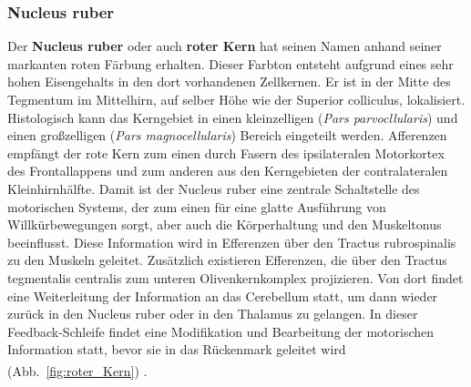 \subsubsection*{Nucleus ruber} 
Der \textbf{Nucleus ruber} oder auch \textbf{roter Kern} hat seinen Namen anhand seiner markanten roten Färbung erhalten. Dieser Farbton entsteht aufgrund eines sehr hohen Eisengehalts in den dort vorhandenen Zellkernen. Er ist in der Mitte des Tegmentum im Mittelhirn, auf selber Höhe wie der Superior colliculus, lokalisiert. Histologisch kann das Kerngebiet in einen kleinzelligen (\textit{Pars parvocllularis}) und einen großzelligen (\textit{Pars magnocellularis}) Bereich eingeteilt werden. Afferenzen empfängt der rote Kern zum einen durch Fasern des ipsilateralen Motorkortex des Frontallappens und zum anderen aus den Kerngebieten der contralateralen Kleinhirnhälfte. Damit ist der Nucleus ruber eine zentrale Schaltstelle des motorischen Systems, der zum einen für eine glatte Ausführung von Willkürbewegungen sorgt, aber auch die Körperhaltung und den Muskeltonus beeinflusst. Diese Information wird in Efferenzen über den Tractus rubrospinalis zu den Muskeln geleitet. Zusätzlich existieren Efferenzen, die über den Tractus tegmentalis centralis zum unteren Olivenkernkomplex projizieren. Von dort findet eine Weiterleitung der Information an das Cerebellum statt, um dann wieder zurück in den Nucleus ruber oder in den Thalamus zu gelangen. In dieser Feedback-Schleife findet eine Modifikation und Bearbeitung der motorischen Information statt, bevor sie in das Rückenmark geleitet wird (Abb.~\ref{fig:roter_Kern}) \textsuperscript{\cite[6]{trepel2011neuroanatomie}}. 

